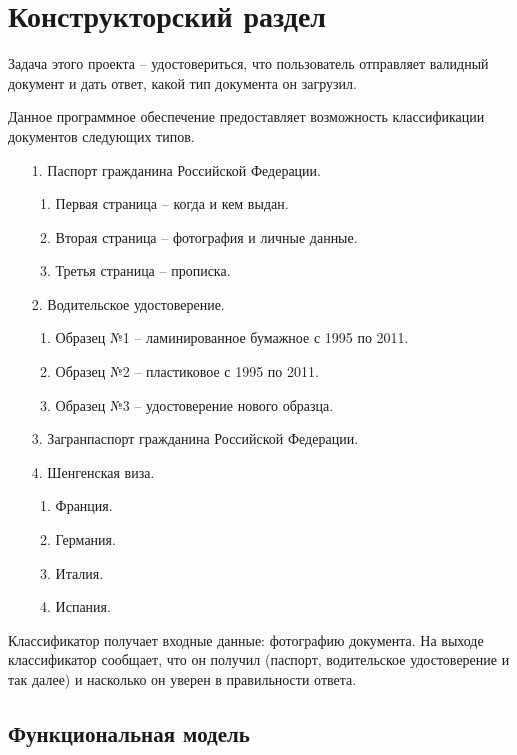 \chapter{\textbf{Конструкторский раздел}}

Задача этого проекта -- удостовериться, что пользователь отправляет валидный документ и дать ответ, какой тип документа он загрузил. 

Данное программное обеспечение предоставляет возможность классификации документов следующих типов. 
\begin{enumerate}
\item[1.] Паспорт гражданина Российской Федерации.
\begin{enumerate}
\item Первая страница -- когда и кем выдан.
\item Вторая страница -- фотография и личные данные.
\item Третья страница -- прописка.
\end{enumerate}
\item[2.] Водительское удостоверение.
\begin{enumerate}
\item Образец №1 -- ламинированное бумажное с 1995 по 2011.
\item Образец №2 -- пластиковое с 1995 по 2011.
\item Образец №3 -- удостоверение нового образца.
\end{enumerate}
\item[3.] Загранпаспорт гражданина Российской Федерации.
\item[4.] Шенгенская виза.
\begin{enumerate}
\item Франция.
\item Германия.
\item Италия.
\item Испания.
\end{enumerate}
\end{enumerate}

Классификатор получает входные данные: фотографию документа. На выходе классификатор сообщает, что он получил (паспорт, водительское удостоверение и так далее) и насколько он уверен в правильности ответа.

\newpage

\section{Функциональная модель}

